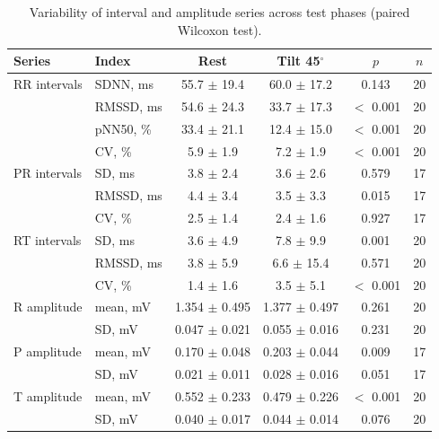 \begin{table}[htbp]
\renewcommand{\thetable}{S1}
\caption{Variability of interval and amplitude series across test phases (paired Wilcoxon test).}
\begin{center}\small
\begin{tabular}{|l|l|c|c|c|c|}
\hline
Series & Index & Rest & Tilt 45$^{\circ}$ & $p$ & $n$ \\
\hline
RR intervals & SDNN, ms & 55.7 $\pm$ 19.4 & 60.0 $\pm$ 17.2 & 0.143 & 20 \\
 & RMSSD, ms & 54.6 $\pm$ 24.3 & 33.7 $\pm$ 17.3 & $<$ 0.001 & 20 \\
 & pNN50, \% & 33.4 $\pm$ 21.1 & 12.4 $\pm$ 15.0 & $<$ 0.001 & 20 \\
 & CV, \% & 5.9 $\pm$ 1.9 & 7.2 $\pm$ 1.9 & $<$ 0.001 & 20 \\
\hline
PR intervals & SD, ms & 3.8 $\pm$ 2.4 & 3.6 $\pm$ 2.6 & 0.579 & 17 \\
 & RMSSD, ms & 4.4 $\pm$ 3.4 & 3.5 $\pm$ 3.3 & 0.015 & 17 \\
 & CV, \% & 2.5 $\pm$ 1.4 & 2.4 $\pm$ 1.6 & 0.927 & 17 \\
\hline
RT intervals & SD, ms & 3.6 $\pm$ 4.9 & 7.8 $\pm$ 9.9 & 0.001 & 20 \\
 & RMSSD, ms & 3.8 $\pm$ 5.9 & 6.6 $\pm$ 15.4 & 0.571 & 20 \\
 & CV, \% & 1.4 $\pm$ 1.6 & 3.5 $\pm$ 5.1 & $<$ 0.001 & 20 \\
\hline
R amplitude & mean, mV & 1.354 $\pm$ 0.495 & 1.377 $\pm$ 0.497 & 0.261 & 20 \\
 & SD, mV & 0.047 $\pm$ 0.021 & 0.055 $\pm$ 0.016 & 0.231 & 20 \\
\hline
P amplitude & mean, mV & 0.170 $\pm$ 0.048 & 0.203 $\pm$ 0.044 & 0.009 & 17 \\
 & SD, mV & 0.021 $\pm$ 0.011 & 0.028 $\pm$ 0.016 & 0.051 & 17 \\
\hline
T amplitude & mean, mV & 0.552 $\pm$ 0.233 & 0.479 $\pm$ 0.226 & $<$ 0.001 & 20 \\
 & SD, mV & 0.040 $\pm$ 0.017 & 0.044 $\pm$ 0.014 & 0.076 & 20 \\
\hline
\end{tabular}
\end{center}
\end{table}
